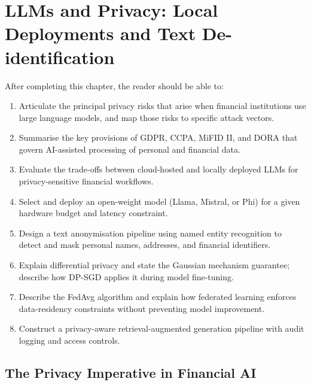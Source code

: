 \chapter{LLMs and Privacy: Local Deployments and Text De-identification}
\label{ch:privacy-local-models}

\begin{remark}
After completing this chapter, the reader should be able to:
\begin{enumerate}
  \item Articulate the principal privacy risks that arise when financial institutions
        use large language models, and map those risks to specific attack vectors.
  \item Summarise the key provisions of GDPR, CCPA, MiFID II, and DORA that govern
        AI-assisted processing of personal and financial data.
  \item Evaluate the trade-offs between cloud-hosted and locally deployed LLMs for
        privacy-sensitive financial workflows.
  \item Select and deploy an open-weight model (Llama, Mistral, or Phi) for a given
        hardware budget and latency constraint.
  \item Design a text anonymisation pipeline using named entity recognition to detect
        and mask personal names, addresses, and financial identifiers.
  \item Explain differential privacy and state the Gaussian mechanism guarantee;
        describe how DP-SGD applies it during model fine-tuning.
  \item Describe the FedAvg algorithm and explain how federated learning enforces
        data-residency constraints without preventing model improvement.
  \item Construct a privacy-aware retrieval-augmented generation pipeline with audit
        logging and access controls.
\end{enumerate}
\end{remark}

\section{The Privacy Imperative in Financial AI}
\label{sec:ch15-privacy-imperative}

